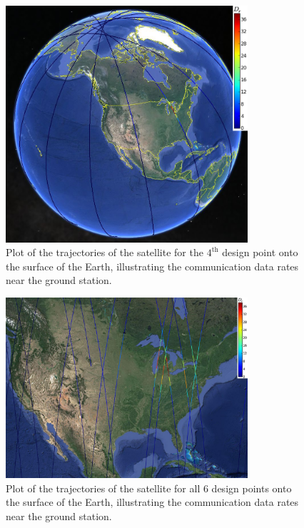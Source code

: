 \documentclass[]{aiaa-tc} %
\begin{document}
        \begin{figure}
        \centering
        \includegraphics[width=0.8\textwidth]{images/pt3_gearth3}
        \caption[width=0.4\textwidth]{Plot of the trajectories of the satellite
        for the $4^{\textrm{th}}$ design point onto the surface of the Earth, illustrating the
        communication data rates near the ground station.
        \label{pt3_g_earth}
        }

        \end{figure}


        \begin{figure}
        \centering
        \includegraphics[width=0.8\textwidth]{images/allpts_map_data}
        \caption[width=0.4\textwidth]{Plot of the trajectories of the satellite
        for all 6 design points onto the surface of the Earth, illustrating the
        communication data rates near the ground station.
        \label{allpt_flatmap}
        }

        \end{figure}
\end{document}
